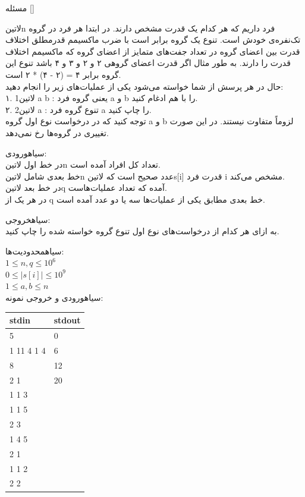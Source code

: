 

‌مسئله []

‌لاتین{n} فرد داریم که هر کدام یک قدرت مشخص دارند. در ابتدا هر فرد در گروه تک‌نفره‌ی خودش است. تنوع یک گروه برابر است با ضرب ماکسیمم قدرمطلق اختلاف قدرت بین اعضای گروه در تعداد جفت‌های متمایز از اعضای گروه که ماکسیمم اختلاف قدرت را دارند. به طور مثال اگر قدرت اعضای گروهی ۲ و ۲ و ۳ و ۴ باشد تنوع این گروه برابر ۴ = (۲ - ۴) * ۲ است.\\
حال در هر پرسش از شما خواسته می‌شود یکی از عملیات‌های زیر را انجام دهید:\\
۱. ‌لاتین{1 a b} : یعنی گروه فرد a و b را با هم ادغام کنید.\\
۲. ‌لاتین{2 a} : تنوع گروه فرد a را چاپ کنید.\\
توجه کنید که در درخواست نوع اول گروه a و b لزوماً متفاوت نیستند. در این صورت تغییری در گروه‌ها رخ نمی‌دهد.

‌سیاه{ورودی:}\\
در خط اول ‌لاتین{n} تعداد کل افراد آمده است.\\
خط بعدی شامل  ‌لاتین{n} عدد صحیح است که ‌لاتین{s[i]} قدرت فرد i مشخص می‌کند.\\
در خط بعد  ‌لاتین{q} آمده که تعداد عملیات‌هاست.\\ 
در هر یک از q خط بعدی مطابق یکی از عملیات‌ها سه یا دو عدد آمده است.

‌سیاه{خروجی:}\\
به ازای هر کدام از درخواست‌های نوع اول تنوع گروه خواسته شده را چاپ کنید.

‌سیاه{محدودیت‌ها:}\\
$1 \leq n, q \leq 10^{6}$\\
$0 \leq |s[i]| \leq 10^{9}$\\
$1 \leq a, b \leq n$\\

‌سیاه{ورودی و خروجی نمونه:}\\

\begin{latin}
	\begin{tabularx}{\textwidth}{|X | X|}
		\hline
		\textbf{stdin} &
		\textbf{stdout}\\
		\hline
		5 & 0\\
		1 11 4 1 4 & 6\\
		8 & 12\\
		2 1 & 20\\
		1 1 3 & \\
		1 1 5&\\
		2 3&\\
		1 4 5&\\
		2 1&\\
		1 1 2&\\
		2 2&\\
		\hline
	\end{tabularx}
\end{latin}


